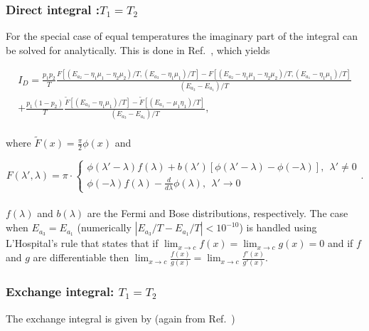 \documentclass{article}
\begin{document}
\subsubsection{Direct integral :$T_1=T_2$}

For the special case of equal temperatures the imaginary part of the integral can be solved for analytically. This is done in Ref.~\cite{leijnse2008kinetic}, which yields

\begin{equation}
\begin{split}
    I_D = \frac{p_1p_2}{T}\frac{F\left [(E_{a_2}-\eta_1\mu_1-\eta_2\mu_2)/T, (E_{a_3}-\eta_1\mu_1)/T\right]- F\left[(E_{a_2}-\eta_1\mu_1-\eta_2\mu_2)/T, (E_{a_1}-\eta_1\mu_1)/T\right]}{(E_{a_3}-E_{a_1})/T} \\
    +\frac{p_1(1-p_2)}{T}\frac{\tilde{F}\left [(E_{a_3}-\eta_1\mu_1)/T\right ] - \tilde{F}\left [ (E_{a_1}-\mu_1\eta_1)/T \right] }{(E_{a_3}-E_{a_1})/T},
\end{split}
\end{equation}
\\
where $\tilde{F}(x)=\frac{\pi}{2}\phi(x)$ and 

\begin{equation}
    F(\lambda', \lambda) = \pi\cdot
    \begin{cases}
         \phi(\lambda'-\lambda)f(\lambda) + b(\lambda')[\phi(\lambda'-\lambda)-\phi(-\lambda)] , \ \ \lambda'\ne 0\\
         \phi(-\lambda)f(\lambda)-\frac{d}{d\lambda}\phi(\lambda) , \ \ \lambda'\rightarrow 0
    \end{cases} .
\end{equation}
\\
$f(\lambda)$ and $b(\lambda)$ are the Fermi and Bose distributions, respectively. The case when $E_{a_3}=E_{a_1}$ (numerically $|E_{a_3}/T-E_{a_1}/T|<10^{-10}$) is handled using L'Hospital's rule that states that if $\lim_{x\rightarrow c}f(x) = \lim_{x\rightarrow c}g(x) = 0$ and if $f$ and $g$ are differentiable then $\lim_{x\rightarrow c}\frac{f(x)}{g(x)} = \lim_{x\rightarrow c}\frac{f'(x)}{g'(x)}$.
\subsubsection{Exchange integral: $T_1=T_2$}

The exchange integral is given by (again from Ref.~\cite{leijnse2008kinetic})
\end{document}
